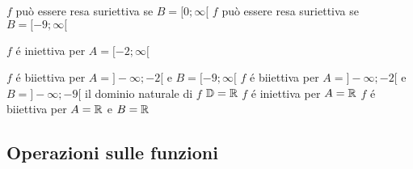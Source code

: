 \begin{questions}
\begin{qblock}
\begin{checkboxes}
            \CorrectChoice $f$  può essere resa suriettiva se  $B=[0;\infty[$
            \CorrectChoice $f$  può essere resa suriettiva se  $B=[-9;\infty[$

            \CorrectChoice $f$ é iniettiva per $A=[-2;\infty[$

                        \choice $f$ é biiettiva per $A=]-\infty;-2[$ e $B=[-9;\infty[$
                        \CorrectChoice $f$ é biiettiva per $A=]-\infty;-2[$ e $B=]-\infty;-9[$
            \CorrectChoice il dominio naturale di $f$ $\mathbb{D}=\mathbb{R}$
            \CorrectChoice $f$ é iniettiva per $A=\mathbb{R}$
            \CorrectChoice $f$ é biiettiva per $A=\mathbb{R}$ e $B=\mathbb{R}$

        \end{checkboxes}
    \end{qblock}
\end{questions}

\subsection{Operazioni sulle funzioni}

